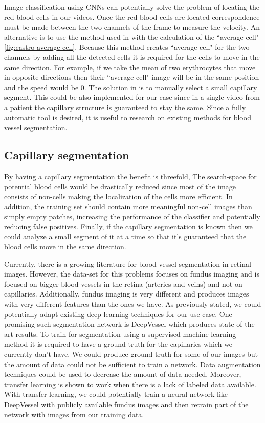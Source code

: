 \documentclass[]{article}
\begin{document}
Image classification using CNNs can potentially solve the problem of locating the red blood cells in our videos.
Once the red blood cells are located correspondence must be made between the two channels of the frame to measure the velocity.
An alternative is to use the method used in\cite{castro_rapid_2016} with the calculation 
of the ``average cell"\ref{fig:castro-average-cell}.
Because this method creates ``average cell" for the two channels by adding all the detected
cells it is required for the cells to move in the same direction. 
For example, if we take the mean of two erythrocytes that move in opposite directions then their ``average cell" image will be in the same position and the speed would be 0.
The solution in\cite{castro_rapid_2016} is to manually select a small capillary segment.
This could be also implemented for our case since in a single video from a patient 
the capillary structure is guaranteed to stay the same.
Since a fully automatic tool is desired, it is useful
to research on existing methods for blood vessel segmentation.
\subsection*{Capillary segmentation}
By having a capillary segmentation the benefit is threefold,
The search-space for potential blood cells would be drastically reduced since
most of the image consists of non-cells making the localization of the cells more efficient.
In addition, the training set should contain more meaningful non-cell images than simply empty patches, increasing the performance of the classifier and potentially reducing false positives.
Finally, if the capillary segmentation is known then we could analyze a
small segment of it at a time so that it's guaranteed that the blood cells move 
in the same direction.

Currently, there is a growing literature for blood vessel segmentation 
in retinal images\cite{liskowski_segmenting_2016}\cite{fu_retinal_2016}\cite{li_cross-modality_2016}. 
However, the data-set for this problems focuses on fundus imaging\cite{fraz_blood_2012} and is focused on bigger blood vessels in the 
retina (arteries and veins) and not on capillaries. 
Additionally, fundus imaging is very different and produces images with very different features than the ones we have.
As previously stated, we could potentially adapt existing deep learning techniques for our use-case.
One promising such segmentation network is DeepVessel\cite{fu_deepvessel_2016} which produces state of the art results.
To train for segmentation using a supervised machine learning method it is required to have a ground truth for the capillaries which we currently don't
have.
We could produce ground truth  for some of our images but the amount of data could not be sufficient to train a network.
Data augmentation techniques could be used to decrease the amount of data needed.
Moreover, transfer learning is shown to work\cite{jiang_retinal_2018} when 
there is a lack of labeled data available.
With transfer learning, we could potentially train a neural network like
DeepVessel with publicly available fundus images and then retrain part of 
the network with images from our training data.
\end{document}
